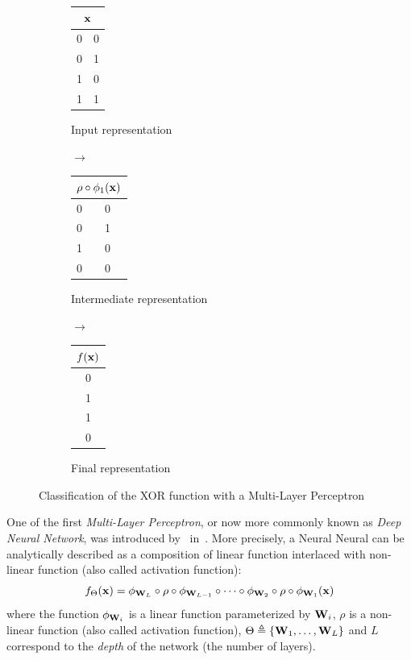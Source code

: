 \begin{figure}[ht]
  \centering
  \begin{subfigure}[t]{0.30\textwidth}
    \centering
    \begin{tabular}{c|c}
      \multicolumn{2}{c}{$\mathbf{x}$} \\
      \midrule
      0 & 0 \\
      0 & 1 \\
      1 & 0 \\
      1 & 1
    \end{tabular} 
    \caption*{Input representation}
  \end{subfigure}
  \begin{subfigure}[t]{0.03\textwidth}
    $\rightarrow$
  \end{subfigure}
  \begin{subfigure}[t]{0.30\textwidth}
    \centering
    \begin{tabular}{C{0.5cm} | C{0.5cm}}
       \\
       & 0 \\
      0 & 1 \\
      1 & 0 \\
      0 & 0
    \end{tabular}
    \caption*{Intermediate representation}
  \end{subfigure}
  \begin{subfigure}[t]{0.03\textwidth}
    $\rightarrow$
  \end{subfigure}
  \begin{subfigure}[t]{0.30\textwidth}
    \centering
    \begin{tabular}{c}
      $f(\mathbf{x})$ \\
      \midrule
      0 \\
      1 \\
      1 \\
      0
    \end{tabular}
    \caption*{Final representation}
  \end{subfigure}
  \caption{Classification of the XOR function with a Multi-Layer Perceptron}
  \label{figure:multi_layer_perceptron}
\end{figure}


One of the first \emph{Multi-Layer Perceptron}, or now more commonly known as \emph{Deep Neural Network}, was introduced by~\citeauthor{ivakhnenko1967cybernetics} in~\citeyear{ivakhnenko1967cybernetics}.
More precisely, a Neural Neural can be analytically described as a composition of linear function interlaced with non-linear function (also called activation function):
\begin{equation}
  f_\Theta(\mathbf{x}) = \phi_{\mathbf{W}_L} \circ \rho \circ \phi_{\mathbf{W}_{L-1}} \circ \cdots \circ \phi_{\mathbf{W}_2} \circ \rho \circ \phi_{\mathbf{W}_1}(\mathbf{x})
  \label{equation:neural_network}
\end{equation}
where the function $\phi_{\mathbf{W}_i}$ is a linear function parameterized by $\mathbf{W}_i$, $\rho$ is a non-linear function (also called activation function), $\Theta \triangleq \{\mathbf{W}_1, \dots, \mathbf{W}_L \}$ and $L$ correspond to the \emph{depth} of the network (\ie the number of layers).


